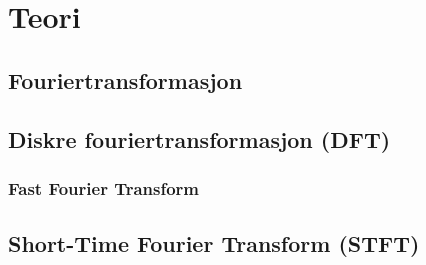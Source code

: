 \section{Teori}

\subsection{Fouriertransformasjon}

\subsection{Diskre fouriertransformasjon (DFT)}

\subsubsection{Fast Fourier Transform}

\subsection{Short-Time Fourier Transform (STFT)}

